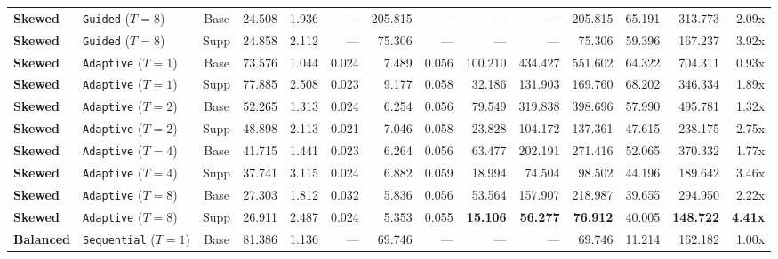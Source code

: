 \documentclass[11pt,a4paper]{article}
\renewcommand{\_}{\textunderscore\allowbreak}
\begin{document}
\begin{table}[H]
{\begin{tabular}{l l c r r r r r r r r r r r}
\textbf{Skewed} & \makecell[l]{\texttt{Guided}\\ ($T=8$)} & Base & 24.508 & 1.936 & --- & 205.815 & --- & --- & --- & 205.815 & 65.191 & 313.773 & 2.09x \\
\textbf{Skewed} & \makecell[l]{\texttt{Guided}\\ ($T=8$)} & Supp & 24.858 & 2.112 & --- & 75.306 & --- & --- & --- & 75.306 & 59.396 & 167.237 & 3.92x \\
\textbf{Skewed} & \makecell[l]{\texttt{Adaptive}\\ ($T=1$)} & Base & 73.576 & 1.044 & 0.024 & 7.489 & 0.056 & 100.210 & 434.427 & 551.602 & 64.322 & 704.311 & 0.93x \\
\textbf{Skewed} & \makecell[l]{\texttt{Adaptive}\\ ($T=1$)} & Supp & 77.885 & 2.508 & 0.023 & 9.177 & 0.058 & 32.186 & 131.903 & 169.760 & 68.202 & 346.334 & 1.89x \\
\textbf{Skewed} & \makecell[l]{\texttt{Adaptive}\\ ($T=2$)} & Base & 52.265 & 1.313 & 0.024 & 6.254 & 0.056 & 79.549 & 319.838 & 398.696 & 57.990 & 495.781 & 1.32x \\
\textbf{Skewed} & \makecell[l]{\texttt{Adaptive}\\ ($T=2$)} & Supp & 48.898 & 2.113 & 0.021 & 7.046 & 0.058 & 23.828 & 104.172 & 137.361 & 47.615 & 238.175 & 2.75x \\
\textbf{Skewed} & \makecell[l]{\texttt{Adaptive}\\ ($T=4$)} & Base & 41.715 & 1.441 & 0.023 & 6.264 & 0.056 & 63.477 & 202.191 & 271.416 & 52.065 & 370.332 & 1.77x \\
\textbf{Skewed} & \makecell[l]{\texttt{Adaptive}\\ ($T=4$)} & Supp & 37.741 & 3.115 & 0.024 & 6.882 & 0.059 & 18.994 & 74.504 & 98.502 & 44.196 & 189.642 & 3.46x \\
\textbf{Skewed} & \makecell[l]{\texttt{Adaptive}\\ ($T=8$)} & Base & 27.303 & 1.812 & 0.032 & 5.836 & 0.056 & 53.564 & 157.907 & 218.987 & 39.655 & 294.950 & 2.22x \\
\textbf{Skewed} & \makecell[l]{\texttt{Adaptive}\\ ($T=8$)} & Supp & 26.911 & 2.487 & 0.024 & 5.353 & 0.055 & \textbf{15.106} & \textbf{56.277} & \textbf{76.912} & 40.005 & \textbf{148.722} & \textbf{4.41x} \\
\textbf{Balanced} & \makecell[l]{\texttt{Sequential}\\ ($T=1$)} & Base & 81.386 & 1.136 & --- & 69.746 & --- & --- & --- & 69.746 & 11.214 & 162.182 & 1.00x \\

\end{tabular}}
\end{table}
\end{document}
